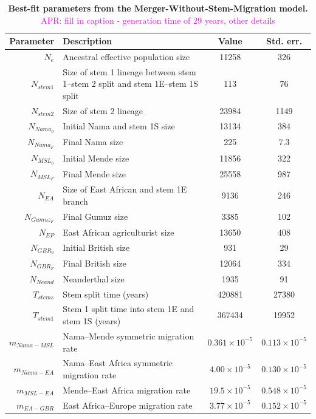 \documentclass[]{article}
\newcommand{\aprcomment}[1]{{\textcolor{magenta}{APR: #1}}}
\begin{document}
\begin{table}[ht]
\caption{
    \label{tab:merger_without_stem_migration}
    \textbf{Best-fit parameters from the Merger-Without-Stem-Migration model.}
    \aprcomment{fill in caption - generation time of 29 years, other details}
}
\centering
\begin{tabular}[t]{rP{8cm}cc}
    \toprule
    Parameter & Description & Value & Std. err.\\
    \midrule
    $N_e$ & Ancestral effective population size & 11258 & 326 \\
    $N_{stem1}$ & Size of stem 1 lineage between stem 1--stem 2 split and stem 1E--stem 1S split & 113 & 76 \\
    $N_{stem2}$ & Size of stem 2 lineage & 23984 & 1149 \\
    $N_{Nama_0}$ & Initial Nama and stem 1S size & 13134 & 384 \\
    $N_{Nama_F}$ & Final Nama size & 225 & 7.3 \\
    $N_{MSL_0}$ & Initial Mende size & 11856 & 322 \\
    $N_{MSL_F}$ & Final Mende size & 25558 & 987 \\
    $N_{EA}$ & Size of East African and stem 1E branch & 9136 & 246 \\
    $N_{Gumuz_F}$ & Final Gumuz size & 3385 & 102 \\
    $N_{EP}$ & East African agriculturist size & 13650 & 408 \\
    $N_{GBR_0}$ & Initial British size & 931 & 29 \\
    $N_{GBR_F}$ & Final British size & 12064 & 334 \\
    $N_{Neand}$ & Neanderthal size & 1935 & 91 \\
    $T_{stems}$ & Stem split time (years) & 420881 & 27380 \\
    $T_{stem1}$ & Stem 1 split time into stem 1E and stem 1S (years) & 367434 & 19952 \\
    $m_{Nama-MSL}$ & Nama--Mende symmetric migration rate & $0.361\times10^{-5}$ & $0.113\times10^{-5}$ \\
    $m_{Nama-EA}$ & Nama--East Africa symmetric migration rate & $4.00\times10^{-5}$ & $0.130\times10^{-5}$ \\
    $m_{MSL-EA}$ & Mende--East Africa migration rate & $19.5\times10^{-5}$ & $0.548\times10^{-5}$ \\
    $m_{EA-GBR}$ & East Africa--Europe migration rate & $3.77\times10^{-5}$ & $0.152\times10^{-5}$ \\

\end{tabular}
\end{table}
\end{document}
